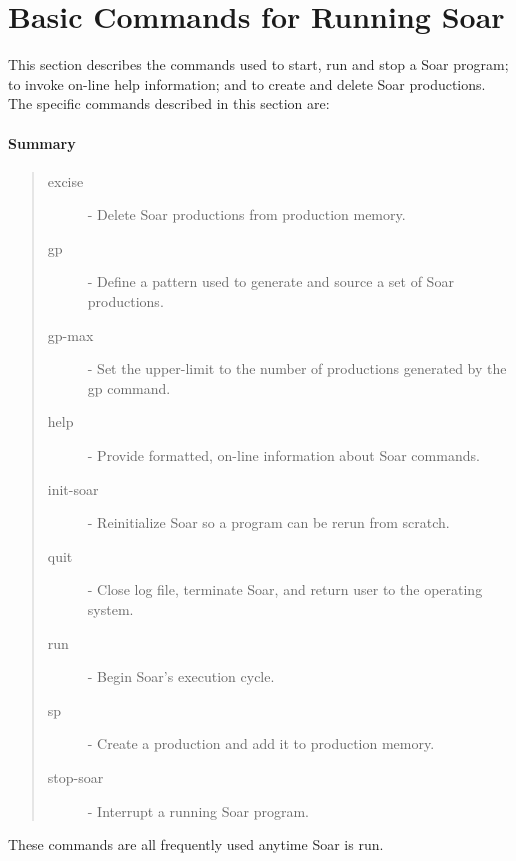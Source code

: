 \section{Basic Commands for Running Soar}
\label{BASIC}

This section describes the commands used to start, run and stop a Soar 
program; to invoke on-line help information; and to create and 
delete Soar productions.  The specific commands described in this
section are:

\paragraph{Summary}
\begin{quote}
\begin{description}
\item[excise] - Delete Soar productions from production memory.
\item[gp] - Define a pattern used to generate and source a set of Soar productions.
\item[gp-max] - Set the upper-limit to the number of productions generated by the gp command.
\item[help] - Provide formatted, on-line information about Soar commands.
\item[init-soar] - Reinitialize Soar so a program can be rerun from scratch.
\item[quit] - Close log file, terminate Soar, and return user to the operating system.
\item[run] - Begin Soar's execution cycle.
\item[sp] - Create a production and add it to production memory.
\item[stop-soar] - Interrupt a running Soar program.
\end{description}
\end{quote}
These commands are all frequently used anytime Soar is run.











